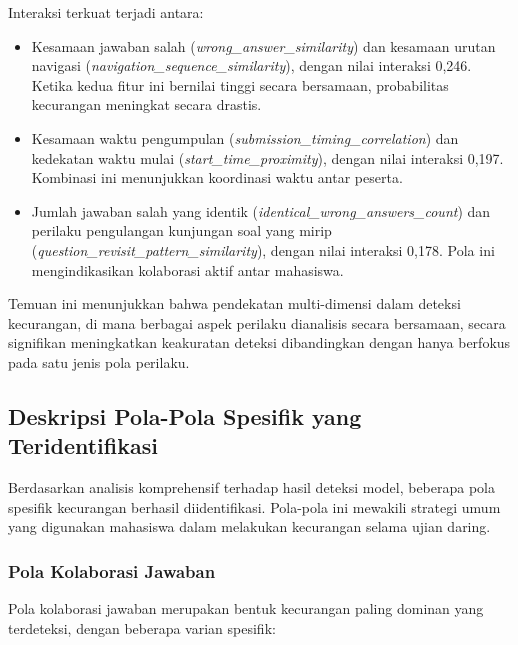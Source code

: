 Interaksi terkuat terjadi antara:
\begin{itemize}
    \item Kesamaan jawaban salah (\textit{wrong\_answer\_similarity}) dan kesamaan urutan navigasi (\textit{navigation\_sequence\_similarity}), dengan nilai interaksi 0,246. Ketika kedua fitur ini bernilai tinggi secara bersamaan, probabilitas kecurangan meningkat secara drastis.
    
    \item Kesamaan waktu pengumpulan (\textit{submission\_timing\_correlation}) dan kedekatan waktu mulai (\textit{start\_time\_proximity}), dengan nilai interaksi 0,197. Kombinasi ini menunjukkan koordinasi waktu antar peserta.
    
    \item Jumlah jawaban salah yang identik (\textit{identical\_wrong\_answers\_count}) dan perilaku pengulangan kunjungan soal yang mirip (\textit{question\_revisit\_pattern\_similarity}), dengan nilai interaksi 0,178. Pola ini mengindikasikan kolaborasi aktif antar mahasiswa.
\end{itemize}

Temuan ini menunjukkan bahwa pendekatan multi-dimensi dalam deteksi kecurangan, di mana berbagai aspek perilaku dianalisis secara bersamaan, secara signifikan meningkatkan keakuratan deteksi dibandingkan dengan hanya berfokus pada satu jenis pola perilaku.

\subsection{Deskripsi Pola-Pola Spesifik yang Teridentifikasi}
\label{subsec:polaPola}

Berdasarkan analisis komprehensif terhadap hasil deteksi model, beberapa pola spesifik kecurangan berhasil diidentifikasi. Pola-pola ini mewakili strategi umum yang digunakan mahasiswa dalam melakukan kecurangan selama ujian daring.

\subsubsection{Pola Kolaborasi Jawaban}

Pola kolaborasi jawaban merupakan bentuk kecurangan paling dominan yang terdeteksi, dengan beberapa varian spesifik:

